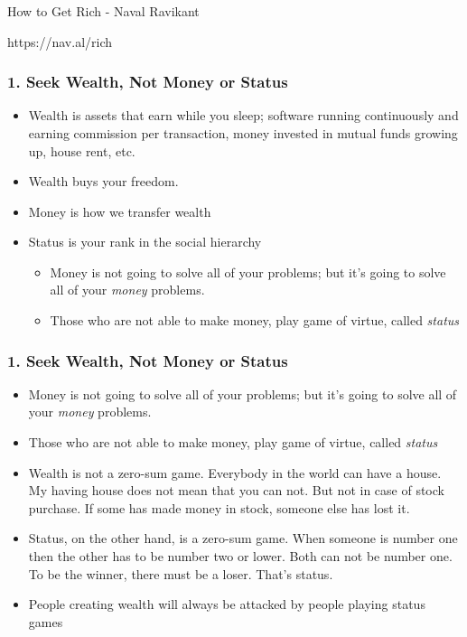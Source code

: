 \begin{frame}[fragile]\frametitle{}
\begin{center}
{\Large How to Get Rich - Naval Ravikant}

{\small https://nav.al/rich}

\end{center}
\end{frame}

\begin{frame}[fragile]
\frametitle{1. Seek Wealth, Not Money or Status}
\begin{itemize}
\item Wealth is assets that earn while you sleep; software running continuously and earning commission per transaction, money invested in mutual funds growing up, house rent, etc.
\item Wealth buys your freedom.

\item Money is how we transfer wealth
\item Status is your rank in the social hierarchy
\begin{itemize}
\item Money is not going to solve all of your problems; but it's going to solve all of your {\it money} problems.
\item Those who are not able to make money, play game of virtue, called {\it status}
\end{itemize}
\end{itemize}
\end{frame}


\begin{frame}[fragile]
\frametitle{1. Seek Wealth, Not Money or Status}
\begin{itemize}
\item Money is not going to solve all of your problems; but it's going to solve all of your {\it money} problems.
\item Those who are not able to make money, play game of virtue, called {\it status}
\item Wealth is not a zero-sum game. Everybody in the world can have a house. My having house does not mean that you can not. But not in case of stock purchase. If some has made money in stock, someone else has lost it.
\item Status, on the other hand, is a zero-sum game. When someone is number one then the other has to be number two or lower. Both can not be number one. To be the winner, there must be a loser. That's status.
\item People creating wealth will always be attacked by people playing status games
\end{itemize}


\end{frame}

